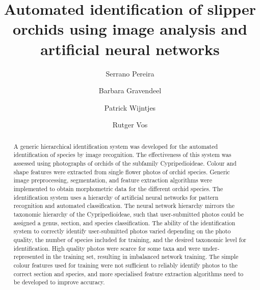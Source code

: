 \documentclass[3p,twocolumn,10pt]{elsarticle}
\begin{document}
\begin{frontmatter}



\title{Automated identification of slipper orchids using image analysis and artificial neural networks}



\author[nbc]{Serrano Pereira}
\author[nbc,hsl,lu]{Barbara Gravendeel}
\author[hsl]{Patrick Wijntjes}
\author[nbc]{Rutger Vos}
\address[nbc]{Naturalis Biodiversity Center, P.O. Box 9517, Leiden, The Netherlands}
\address[hsl]{University of Applied Sciences Leiden, P.O. Box 382, Leiden, The Netherlands}
\address[lu]{Institute Biology Leiden, Leiden University, P.O. Box 546, Leiden, The Netherlands}


\begin{abstract}
A generic hierarchical identification system was developed for the automated identification of species by image recognition. The effectiveness of this system was assessed using photographs of orchids of the subfamily Cypripedioideae. Colour and shape features were extracted from single flower photos of {\SpeciesCount} orchid species. Generic image preprocessing, segmentation, and feature extraction algorithms were implemented to obtain morphometric data for the different orchid species. The identification system uses a hierarchy of artificial neural networks for pattern recognition and automated classification. The neural network hierarchy mirrors the taxonomic hierarchy of the Cypripedioideae, such that user-submitted photos could be assigned a genus, section, and species classification. The ability of the identification system to correctly identify user-submitted photos varied depending on the photo quality, the number of species included for training, and the desired taxonomic level for identification. High quality photos were scarce for some taxa and were under-represented in the training set, resulting in imbalanced network training. The simple colour features used for training were not sufficient to reliably identify photos to the correct section and species, and more specialised feature extraction algorithms need to be developed to improve accuracy.
\end{abstract}


\end{frontmatter}
\end{document}
